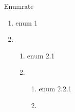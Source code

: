 \documentclass[aspectratio=169, dvipdfmx, 14pt, xcolor={svgnames,dvipsnames}]{beamer}
\begin{document}
\begin{frame}{Enumrate}
  \begin{enumerate}
    \item enum 1
    \item {}
          \begin{enumerate}
            \item enum 2.1
            \item {}
                  \begin{enumerate}
                    \item enum 2.2.1
                    \item {}
                  \end{enumerate}
          \end{enumerate}
  \end{enumerate}
\end{frame}


\backupend
\end{document}

